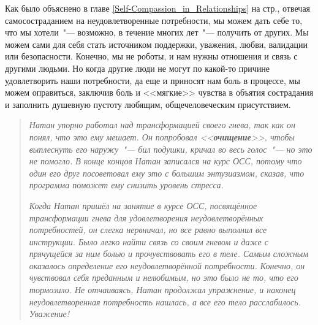 Как было объяснено в главе \ref{Self-Compassion_in_Relationships} на стр.\:\pageref{Self-Compassion_in_Relationships}, отвечая самосостраданием на неудовлетворенные потребности, мы можем дать себе то, что мы хотели~"--- возможно, в течение многих лет~"--- получить от других. Мы можем сами для себя стать источником поддержки, уважения, любви, валидации или безопасности. Конечно, мы не роботы, и нам нужны отношения и связь с другими людьми. Но когда другие люди не могут по какой-то причине удовлетворить наши потребности, да еще и приносят нам боль в процессе, мы можем оправиться, заключив боль и <<мягкие>> чувства в объятия сострадания и заполнить душевную пустоту любящим, общечеловеческим присутствием.

\begin{quotation}
	\textit{
		Натан упорно работал над трансформацией своего гнева, так как он понял, что это ему мешает. Он попробовал <<\textbf{очищение}>>, чтобы выплеснуть его наружу~"--- бил подушки, кричал во весь голос~"--- но это не помогло. В конце концов Натан записался на курс ОСС, потому что один его друг посоветовал ему это с большим энтузиазмом, сказав, что программа поможет ему снизить уровень стресса.
	}
	
	\textit{
		Когда Натан пришёл на занятие в курсе ОСС, посвящённое трансформации гнева для удовлетворения неудовлетворённых потребностей, он слегка нервничал, но все равно выполнил все инструкции. Было легко найти связь со своим гневом и даже с прячущейся за ним болью и прочувствовать его в теле. Самым сложным оказалось определение его неудовлетворённой потребности. Конечно, он чувствовал себя преданным и нелюбимым, но это было не то, что его тормозило. Не отчаиваясь, Натан продолжал упражнение, и наконец неудовлетворенная потребность нашлась, а все его тело расслабилось. Уважение!
	}
	

\end{quotation}
